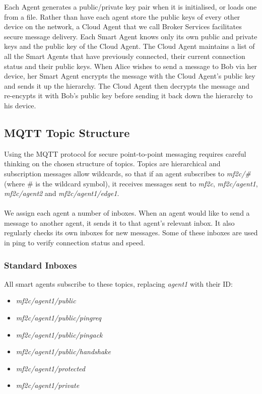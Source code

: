 Each Agent generates a public/private key pair when it is initialised, or loads one from a file. Rather than have each agent store the public keys of every other device on the network, a Cloud Agent that we call Broker Services facilitates secure message delivery. Each Smart Agent knows only its own public and private keys and the public key of the Cloud Agent. The Cloud Agent maintains a list of all the Smart Agents that have previously connected, their current connection status and their public keys. When Alice wishes to send a message to Bob via her device, her Smart Agent encrypts the message with the Cloud Agent's public key and sends it up the hierarchy. The Cloud Agent then decrypts the message and re-encypts it with Bob's public key before sending it back down the hierarchy to his device.



\subsection{MQTT Topic Structure}


Using the MQTT protocol for secure point-to-point messaging requires careful thinking on the chosen structure of topics. Topics are hierarchical and subscription messages allow wildcards, so that if an agent subscribes to \textit{mf2c/\#} (where \# is the wildcard symbol), it receives messages sent to \textit{mf2c}, \textit{mf2c/agent1}, \textit{mf2c/agent2} and \textit{mf2c/agent1/edge1}.

\paragraph{}
We assign each agent a number of inboxes. When an agent would like to send a message to another agent, it sends it to that agent's relevant inbox. It also regularly checks its own inboxes for new messages. Some of these inboxes are used in ping to verify connection status and speed.


\subsubsection{Standard Inboxes}
All smart agents subscribe to these topics, replacing \textit{agent1} with their ID:
\begin{itemize}
    \item \textit{mf2c/agent1/public}
    \item \textit{mf2c/agent1/public/pingreq}
    \item \textit{mf2c/agent1/public/pingack}
    \item \textit{mf2c/agent1/public/handshake}
    \item \textit{mf2c/agent1/protected}
    \item \textit{mf2c/agent1/private}
\end{itemize}

